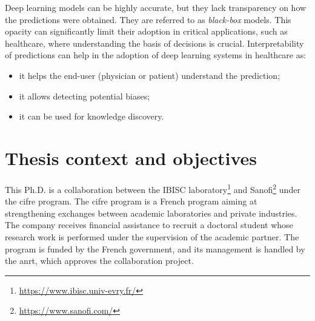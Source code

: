 \documentclass[../main.tex]{subfiles}
\begin{document}
	Deep learning models can be highly accurate, but they lack transparency on how the predictions were obtained.
	They are referred to as \emph{black-box} models.
	This opacity can significantly limit their adoption in critical applications, such as healthcare,  where understanding the basis of decisions is crucial.
	Interpretability of predictions can help in the adoption of deep learning systems in healthcare as:
	\begin{itemize}[nosep]
		\item it helps the end-user (physician or patient) understand the prediction;
		\item it allows detecting potential biases;
		\item it can be used for knowledge discovery.
	\end{itemize}

\section{Thesis context and objectives}
	This Ph.D. is a collaboration between the IBISC laboratory\footnote{\url{https://www.ibisc.univ-evry.fr/}} and Sanofi\footnote{\url{https://www.sanofi.com/}} under the \gls{cifre} program.
	The \gls{cifre} program is a French program aiming at strengthening exchanges between academic laboratories and private industries.
	The company receives financial assistance to recruit a doctoral student whose research work is performed under the supervision of the academic partner.
	The program is funded by the French government, and its management is handled by the \gls{anrt}, which approves the collaboration project.
\end{document}
